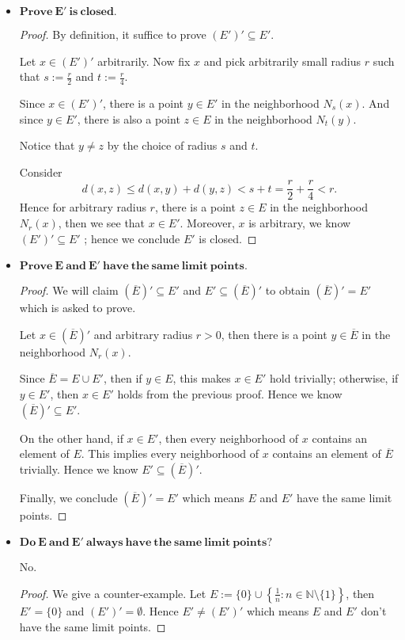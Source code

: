 \begin{Exercise}
\begin{itemize}
\item $\mathbf{Prove\ E'\ is\ closed.}$
\begin{proof}
By definition, it suffice to prove $(E')' \subseteq E'$. 

Let $x\in (E')'$ arbitrarily. Now fix $x$ and pick arbitrarily small radius $r$ such that $s := \frac{r}{2}$ and $t := \frac{r}{4}$.

Since $x\in (E')'$, there is a point $y\in E'$ in the neighborhood $N_s(x)$. And since $y\in E'$, there is also a point $z\in E$ in the neighborhood $N_t(y)$. 

Notice that $y\neq z$ by the choice of radius $s$ and $t$.

Consider
$$
d(x,z)
\leq d(x,y) + d(y,z)
< s + t
= \frac{r}{2} + \frac{r}{4}
< r.
$$
Hence for arbitrary radius $r$, there is a point $z\in E$ in the neighborhood $N_r(x)$, then we see that $x\in E'$. Moreover, $x$ is arbitrary, we know $(E')' \subseteq E'$ ; hence we conclude $E'$ is closed.
\end{proof}

\item $\mathbf{Prove\ E\ and\ E'\ have\ the\ same\ limit\ points.}$

\begin{proof}
We will claim $(\overline{E})' \subseteq E'$ and $E' \subseteq (\overline{E})'$ to obtain $(\overline{E})' = E'$ which is asked to prove.

Let $x\in (\overline{E})'$ and arbitrary radius $r > 0$, then there is a point $y\in \overline{E}$ in the neighborhood $N_r(x)$.

Since $\overline{E} = E\cup E'$, then if $y\in E$, this makes $x\in E'$ hold trivially; otherwise, if $y\in E'$, then $x\in E'$ holds from the previous proof. Hence we know $(\overline{E})' \subseteq E'$.

On the other hand, if $x\in E'$, then every neighborhood of $x$ contains an element of $E$. This implies every neighborhood of $x$ contains an element of $\overline{E}$ trivially. Hence we know $E' \subseteq (\overline{E})'$.

Finally, we conclude $(\overline{E})' = E'$ which means $E$ and $E'$ have the same limit points.
\end{proof}

\item $\mathbf{Do\ E\ and\ E'\ always\ have\ the\ same\ limit\ points?}$
\begin{answer}
No.
\end{answer}
\begin{proof}
We give a counter-example.
Let $E := \{0\} \cup \left\{ \frac{1}{n}:n\in\mathbb{N}\setminus\{1\} \right\}$, then $E' = \{0\}$ and $(E')' = \emptyset$. Hence $E' \neq (E')'$ which means $E$ and $E'$ don't have the same limit points.
\end{proof}
\end{itemize}
\end{Exercise}